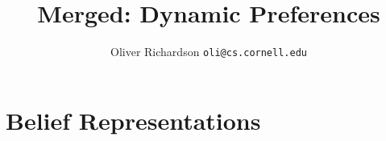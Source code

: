 \documentclass{article}
\title{Merged: Dynamic Preferences}
\author{Oliver Richardson  \texttt{oli@cs.cornell.edu}}
\begin{document}
	\maketitle
	
	
	
	
	\section{}
	

	


	
%	
%	
%	
	
	


	
	\part{Belief Representations}
	
\end{document}
